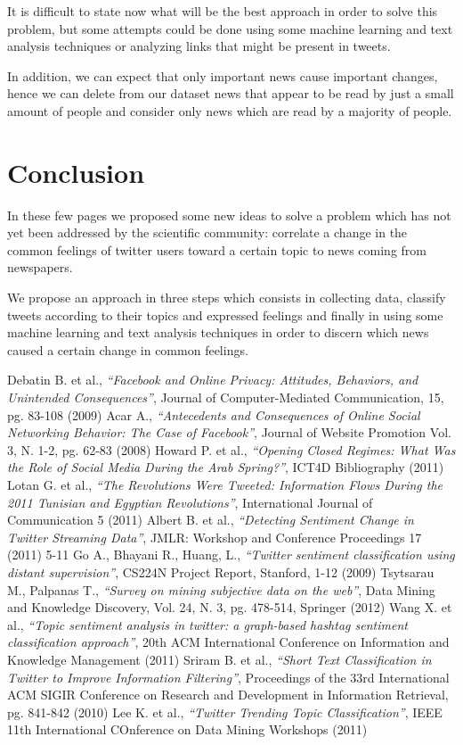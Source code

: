 \documentclass[a4paper]{article}
\begin{document}
It is difficult to state now what will be the best approach in order to solve
this problem, but some attempts could be done using some machine learning and
text analysis techniques or analyzing links that might be present in tweets.

In addition, we can expect that only important news cause important changes,
hence we can delete from our dataset news that appear to be read by just a small
amount of people and consider only news which are read by a majority of people.

\section{Conclusion}
In these few pages we proposed some new ideas to solve a problem which has not
yet been addressed by the scientific community: correlate a change in the common
feelings of twitter users toward a certain topic to news coming from newspapers.

We propose an approach in three steps which consists in collecting data,
classify tweets according to their topics and expressed feelings and finally in
using some machine learning and text analysis techniques in order to discern
which news caused a certain change in common feelings.


\begin{thebibliography}{9}
Debatin B. et al., \emph{``Facebook and Online Privacy: Attitudes, Behaviors,
and Unintended Consequences''}, Journal of Computer-Mediated Communication,
15, pg. 83-108 (2009)
Acar A., \emph{``Antecedents and Consequences of Online Social Networking
Behavior: The Case of Facebook''}, Journal of Website Promotion Vol. 3, N.
1-2, pg. 62-83 (2008)
Howard P. et al., \emph{``Opening Closed Regimes: What Was the Role of Social Media
During the Arab Spring?''}, ICT4D Bibliography (2011)
Lotan G. et al., \emph{``The Revolutions Were Tweeted: Information Flows During
the 2011 Tunisian and Egyptian Revolutions''}, International Journal of
Communication 5 (2011)
Albert B. et al., \emph{``Detecting Sentiment Change in Twitter Streaming
	Data''}, JMLR: Workshop and Conference Proceedings 17 (2011) 5-11
Go A., Bhayani R., Huang, L., \emph{``Twitter sentiment classification using
	distant supervision''}, CS224N Project Report, Stanford, 1-12 (2009)
Tsytsarau M., Palpanas T., \emph{``Survey on mining subjective data on the
	web''}, Data Mining and Knowledge Discovery, Vol. 24, N. 3, pg. 478-514,
	Springer (2012)
Wang X. et al., \emph{``Topic sentiment analysis in twitter: a graph-based
hashtag sentiment classification approach''}, 20th ACM International
Conference on Information and Knowledge Management (2011) 
Sriram B. et al., \emph{``Short Text Classification in Twitter to Improve
	Information Filtering''}, Proceedings of the 33rd International ACM SIGIR
	Conference on Research and Development in Information Retrieval, pg. 841-842 (2010)
Lee K. et al., \emph{``Twitter Trending Topic Classification''}, IEEE 11th
International COnference on Data Mining Workshops (2011)
\end{thebibliography}
\end{document}
